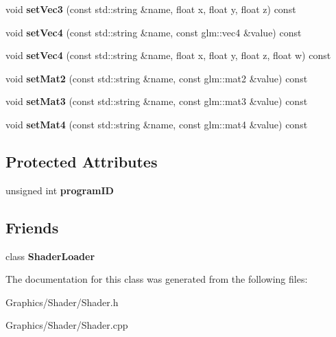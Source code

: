 \begin{DoxyCompactItemize}
\mbox{\label{classce_1_1graphics_1_1_shader_aee1a36cd3264b09aed26b99c0fea05ad}} 
void {\bfseries set\+Vec3} (const std\+::string \&name, float x, float y, float z) const
\item 
\mbox{\label{classce_1_1graphics_1_1_shader_a77137819a5a8b7ec1313c19a0aef52b2}} 
void {\bfseries set\+Vec4} (const std\+::string \&name, const glm\+::vec4 \&value) const
\item 
\mbox{\label{classce_1_1graphics_1_1_shader_aa2ce76f7663f91497157017868d4a85e}} 
void {\bfseries set\+Vec4} (const std\+::string \&name, float x, float y, float z, float w) const
\item 
\mbox{\label{classce_1_1graphics_1_1_shader_a6355f9a1480838ce2f1ef8030ef1c259}} 
void {\bfseries set\+Mat2} (const std\+::string \&name, const glm\+::mat2 \&value) const
\item 
\mbox{\label{classce_1_1graphics_1_1_shader_a52a066ab5a24e7f4596931e9c0e325e6}} 
void {\bfseries set\+Mat3} (const std\+::string \&name, const glm\+::mat3 \&value) const
\item 
\mbox{\label{classce_1_1graphics_1_1_shader_ae5f67d260222f5b315ea097b3d898c9f}} 
void {\bfseries set\+Mat4} (const std\+::string \&name, const glm\+::mat4 \&value) const
\end{DoxyCompactItemize}
\subsection*{Protected Attributes}
\begin{DoxyCompactItemize}
\item 
\mbox{\label{classce_1_1graphics_1_1_shader_a5b5ac3fe6dd6c31fb774d3b670d87c8d}} 
unsigned int {\bfseries program\+ID}
\end{DoxyCompactItemize}
\subsection*{Friends}
\begin{DoxyCompactItemize}
\item 
\mbox{\label{classce_1_1graphics_1_1_shader_a1ab9ba285584cda12cc4729fccb36f96}} 
class {\bfseries Shader\+Loader}
\end{DoxyCompactItemize}


The documentation for this class was generated from the following files\+:\begin{DoxyCompactItemize}
\item 
Graphics/\+Shader/Shader.\+h\item 
Graphics/\+Shader/Shader.\+cpp\end{DoxyCompactItemize}

